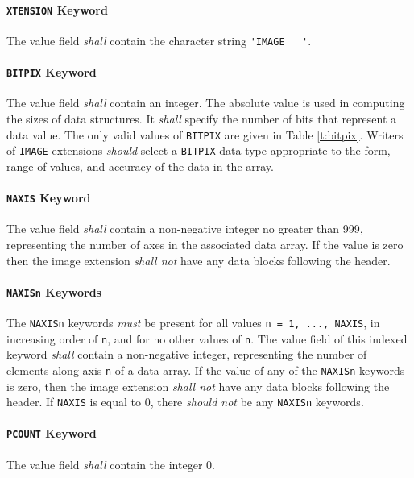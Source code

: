 \documentclass[11pt,makeidx]{book}     %
\begin{document}
   \paragraph{{\tt XTENSION} Keyword}
 The value field {\em shall} contain the
 character string  \verb*+'IMAGE   '+.
  
   \paragraph{{\tt BITPIX} Keyword}
 The value field {\em shall} contain an integer.  The
 absolute value is used 
 in computing the sizes of data structures.  It {\em shall} specify
 the number of bits that represent a data value. The only valid values 
 of {\tt BITPIX} are given in Table \ref{t:bitpix}.
Writers of {\tt IMAGE} extensions {\em should} select a {\tt BITPIX} data type 
appropriate to the form, range of values, and accuracy of the data in the array.

   \paragraph{{\tt NAXIS} Keyword}
 The value field {\em shall} contain a non-negative integer no greater than
 999, representing the number of axes in the associated data
 array. If the value is zero then the image extension
 {\em shall not} have any data blocks following the
 header.

   \paragraph{{\tt NAXISn} Keywords}
   \label{s:naxisni}
 The {\tt NAXISn} keywords {\em must} be present 
 for all values {\tt n = 1, ..., NAXIS}, in increasing order of {\tt n}, and for no other values of
 {\tt n}.
 The value field of this indexed keyword {\em shall} contain a non-negative 
 integer, representing the number of elements along axis {\tt n} of 
 a data array. If the value of any of the {\tt NAXISn} keywords is zero, 
 then the image extension {\em shall not} have any data blocks following the
 header.  If {\tt NAXIS} is equal to 0, 
 there {\em should not} be any {\tt NAXISn}  keywords.
  
   \paragraph{{\tt PCOUNT} Keyword}
 The value field {\em shall} contain the integer 0. 
  
\end{document}
